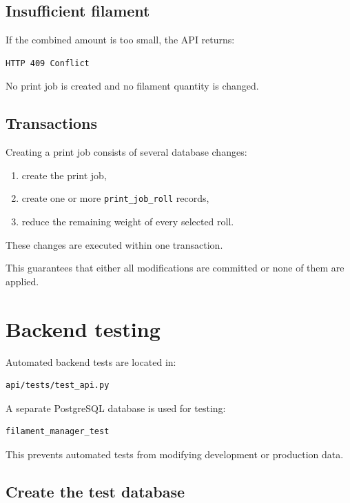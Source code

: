 \documentclass[a4paper,11pt]{article}
\begin{document}
\subsection{Insufficient filament}

If the combined amount is too small, the API returns:

\begin{lstlisting}
HTTP 409 Conflict
\end{lstlisting}

No print job is created and no filament quantity is changed.

\subsection{Transactions}

Creating a print job consists of several database changes:

\begin{enumerate}
  \item create the print job,
  \item create one or more \texttt{print\_job\_roll} records,
  \item reduce the remaining weight of every selected roll.
\end{enumerate}

These changes are executed within one transaction.

This guarantees that either all modifications are committed or none of them
are applied.

\section{Backend testing}

Automated backend tests are located in:

\begin{lstlisting}
api/tests/test_api.py
\end{lstlisting}

A separate PostgreSQL database is used for testing:

\begin{lstlisting}
filament_manager_test
\end{lstlisting}

This prevents automated tests from modifying development or production data.

\subsection{Create the test database}
\end{document}
